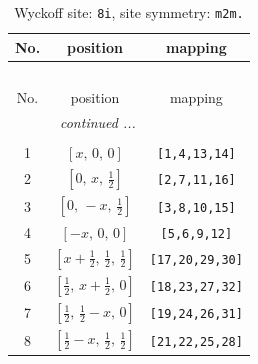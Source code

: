 \documentclass[fleqn,8pt]{jsarticle}
\begin{document}
\begin{longtable}{ccc}
\caption{Wyckoff site: {\tt 8i}, site symmetry: {\tt m2m.}}
 \\
 \hline \hline
No. & position & mapping \\ \hline \endfirsthead

\multicolumn{2}{l}{\tablename\ \thetable{}} \\
 \hline \hline
No. & position & mapping \\ \hline \endhead

 \hline \hline
\multicolumn{2}{r}{\footnotesize\it continued ...} \\ \endfoot

 \hline \hline
\multicolumn{2}{r}{} \\ \endlastfoot

1 & $\left[ x,\, 0,\, 0 \right]$ & {\tt [1,4,13,14]} \\ \hline
2 & $\left[ 0,\, x,\, \frac{1}{2} \right]$ & {\tt [2,7,11,16]} \\ \hline
3 & $\left[ 0,\, - x,\, \frac{1}{2} \right]$ & {\tt [3,8,10,15]} \\ \hline
4 & $\left[ - x,\, 0,\, 0 \right]$ & {\tt [5,6,9,12]} \\ \hline
5 & $\left[ x + \frac{1}{2},\, \frac{1}{2},\, \frac{1}{2} \right]$ & {\tt [17,20,29,30]} \\ \hline
6 & $\left[ \frac{1}{2},\, x + \frac{1}{2},\, 0 \right]$ & {\tt [18,23,27,32]} \\ \hline
7 & $\left[ \frac{1}{2},\, \frac{1}{2} - x,\, 0 \right]$ & {\tt [19,24,26,31]} \\ \hline
8 & $\left[ \frac{1}{2} - x,\, \frac{1}{2},\, \frac{1}{2} \right]$ & {\tt [21,22,25,28]} \\
\end{longtable}
\renewcommand{\arraystretch}{1.2}
\end{document}
